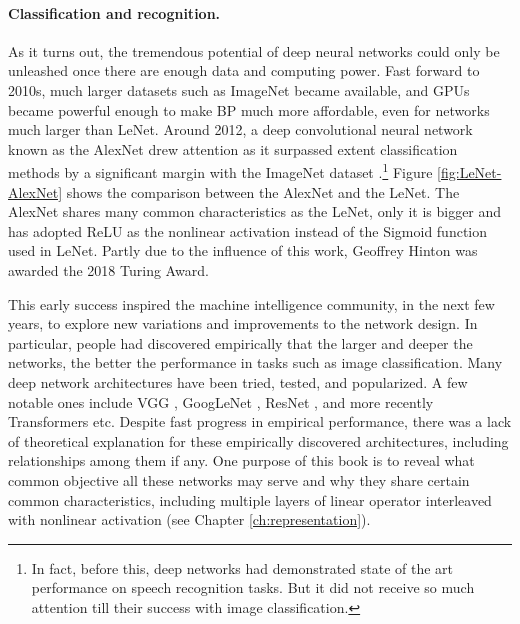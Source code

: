 \documentclass[\toplevelprefix/book-main.tex]{subfiles}
\begin{document}
\paragraph{Classification and recognition.}
As it turns out, the tremendous potential of deep neural networks could only be unleashed once there are enough data and computing power. Fast forward to 2010s, much larger datasets such as ImageNet became available, and GPUs became powerful enough to make BP much more affordable, even for networks much larger than LeNet. Around 2012, a deep convolutional neural network known as the AlexNet drew attention as it surpassed extent classification methods by a significant margin with the ImageNet dataset \cite{krizhevsky2012imagenet}.\footnote{In fact, before this, deep networks had demonstrated state of the art performance on speech recognition tasks. But it did not receive so much attention till their success with image classification.} Figure \ref{fig:LeNet-AlexNet} shows the comparison between the AlexNet and the LeNet. The AlexNet shares many common characteristics as the LeNet, only it is bigger and has adopted ReLU as the nonlinear activation instead of the Sigmoid function used in LeNet. Partly due to the influence of this work, Geoffrey Hinton was awarded the 2018 Turing Award.


This early success inspired the machine intelligence community, in the next few years, to explore new variations and improvements to the network design. In particular, people had discovered empirically that the larger and deeper the networks, the better the performance in tasks such as image classification. Many deep network architectures have been tried, tested, and popularized. A few notable ones include VGG \cite{Simonyan15}, GoogLeNet \cite{Szegedy2014GoingDW}, ResNet \cite{He2016-lc}, and more recently Transformers \cite{vaswani2017attention} etc. Despite fast progress in empirical performance, there was a lack of theoretical explanation for these empirically discovered architectures, including relationships among them if any. One purpose of this book is to reveal what common objective all these networks may serve and why they share certain common characteristics, including multiple layers of linear operator interleaved with nonlinear activation (see Chapter \ref{ch:representation}). 
\end{document}

